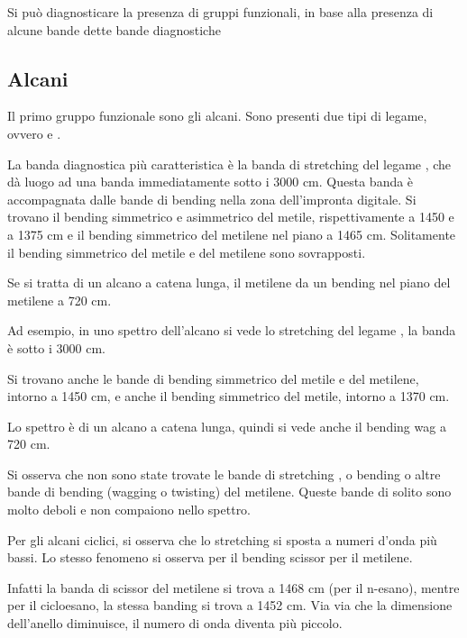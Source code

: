 Si può diagnosticare la presenza di gruppi funzionali, in base alla
presenza di alcune bande dette bande diagnostiche

\subsection{Alcani}

Il primo gruppo funzionale sono gli alcani. Sono presenti due tipi di
legame, ovvero  e .

La banda diagnostica più caratteristica è la banda di stretching del
legame , che dà luogo ad una banda immediatamente sotto i 3000 cm.
Questa banda è accompagnata dalle bande di bending nella zona
dell'impronta digitale. Si trovano il bending simmetrico e asimmetrico
del metile, rispettivamente a 1450 e a 1375 cm e il bending simmetrico
del metilene nel piano a 1465 cm. Solitamente il bending simmetrico
del metile e del metilene sono sovrapposti.


Se si tratta di un alcano a catena lunga, il metilene da un bending nel
piano del metilene a 720 cm.

Ad esempio, in uno spettro dell'alcano si vede lo stretching del legame
, la banda è sotto i 3000 cm.

Si trovano anche le bande di bending simmetrico del metile e del
metilene, intorno a 1450 cm, e anche il bending simmetrico del metile,
intorno a 1370 cm.

Lo spettro è di un alcano a catena lunga, quindi si vede anche il
bending wag a 720 cm.

Si osserva che non sono state trovate le bande di stretching , o
bending  o altre bande di bending (wagging o twisting) del metilene.
Queste bande di solito sono molto deboli e non compaiono nello spettro.


Per gli alcani ciclici, si osserva che lo stretching  si sposta a
numeri d'onda più bassi. Lo stesso fenomeno si osserva per il bending
scissor per il metilene.

Infatti la banda di scissor del metilene si trova a 1468 cm (per il
n-esano), mentre per il cicloesano, la stessa banding si trova a 1452
cm. Via via che la dimensione dell'anello diminuisce, il numero di
onda diventa più piccolo.

